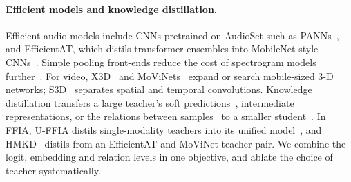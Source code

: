 \paragraph{Efficient models and knowledge distillation.}
Efficient audio models include CNNs pretrained on AudioSet such as PANNs~\cite{kong2020panns}, and
EfficientAT, which distils transformer ensembles into MobileNet-style CNNs~\cite{schmid2023efficientat}.
Simple pooling front-ends reduce the cost of spectrogram models further~\cite{liu2023simpf}.
For video, X3D~\cite{feichtenhofer2020x3d} and MoViNets~\cite{kondratyuk2021movinets} expand or search
mobile-sized 3-D networks; S3D~\cite{xie2018s3d} separates spatial and temporal convolutions.
Knowledge distillation transfers a large teacher's soft predictions~\cite{hinton2015kd}, intermediate
representations, or the relations between samples~\cite{park2019rkd} to a smaller student~\cite{gou2021kdsurvey}.
In FFIA, U-FFIA distils single-modality teachers into its unified model~\cite{cui2024uffia}, and
HMKD~\cite{hmkd2026} distils from an EfficientAT and MoViNet teacher pair. We combine the logit,
embedding and relation levels in one objective, and ablate the choice of teacher systematically.
